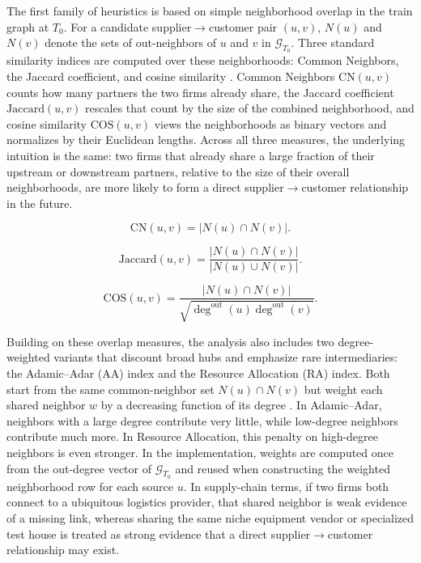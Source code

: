 The first family of heuristics is based on simple neighborhood overlap in the train graph at \(T_0\). For a candidate supplier\(\rightarrow\)customer pair \((u,v)\), \(N(u)\) and \(N(v)\) denote the sets of out-neighbors of \(u\) and \(v\) in \(\mathcal{G}_{T_0}\). Three standard similarity indices are computed over these neighborhoods: Common Neighbors, the Jaccard coefficient, and cosine similarity \parencite{liben-nowell_link_2003,jaccard_etude_1901,real_probabilistic_1996,salton_vector_1975,manning_introduction_2008}. Common Neighbors \(\mathrm{CN}(u,v)\) counts how many partners the two firms already share, the Jaccard coefficient \(\mathrm{Jaccard}(u,v)\) rescales that count by the size of the combined neighborhood, and cosine similarity \(\mathrm{COS}(u,v)\) views the neighborhoods as binary vectors and normalizes by their Euclidean lengths. Across all three measures, the underlying intuition is the same: two firms that already share a large fraction of their upstream or downstream partners, relative to the size of their overall neighborhoods, are more likely to form a direct supplier\(\rightarrow\)customer relationship in the future.

\[
\mathrm{CN}(u,v) = |N(u)\cap N(v)|.
\]

\[
\mathrm{Jaccard}(u,v) = \frac{|N(u)\cap N(v)|}{|N(u)\cup N(v)|}.
\]

\[
\mathrm{COS}(u,v) = \frac{|N(u)\cap N(v)|}{\sqrt{\deg^{\text{out}}(u)\deg^{\text{out}}(v)}}.
\]
\bigskip

Building on these overlap measures, the analysis also includes two degree-weighted variants that discount broad hubs and emphasize rare intermediaries: the Adamic--Adar (AA) index and the Resource Allocation (RA) index. Both start from the same common-neighbor set \(N(u)\cap N(v)\) but weight each shared neighbor \(w\) by a decreasing function of its degree \parencite{adamic_friends_2003,zhou_predicting_2009,lu_link_2011}. In Adamic--Adar, neighbors with a large degree contribute very little, while low-degree neighbors contribute much more. In Resource Allocation, this penalty on high-degree neighbors is even stronger. In the implementation, weights are computed once from the out-degree vector of \(\mathcal{G}_{T_0}\) and reused when constructing the weighted neighborhood row for each source \(u\). In supply-chain terms, if two firms both connect to a ubiquitous logistics provider, that shared neighbor is weak evidence of a missing link, whereas sharing the same niche equipment vendor or specialized test house is treated as strong evidence that a direct supplier\(\rightarrow\)customer relationship may exist.


